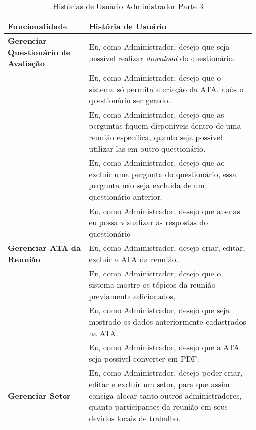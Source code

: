 \begin{table}[H]
	\begin{tabular}{|p{5.0cm}|p{10.0cm}|} 
	\hline
	\textbf{Funcionalidade} & \textbf{História de Usuário} \\ \hline
	\textbf{Gerenciar Questionário de Avaliação} & Eu, como Administrador, desejo que seja possível realizar \textit{download} do questionário. \\ \hline
	& Eu, como Administrador, desejo que o sistema só permita a criação da ATA, após o questionário ser gerado. \\ \hline
	& Eu, como Administrador, desejo que as perguntas fiquem disponíveis dentro de uma reunião específica, quanto seja possível utilizar-las em outro questionário. \\ \hline
	& Eu, como Administrador, desejo que ao excluir uma pergunta do questionário, essa pergunta não seja excluida de um questionário anterior. \\ \hline
	& Eu, como Administrador, desejo que apenas eu possa visualizar as respostas do questionário \\ \hline
	\textbf{Gerenciar ATA da Reunião} & Eu, como Administrador, desejo criar, editar, excluir a ATA da reunião.\\ \hline
	& Eu, como Administrador, desejo que o sistema mostre os tópicos da reunião previamente adicionados, \\ \hline
	& Eu, como Administrador, desejo que seja mostrado os dados anteriormente cadastrados na ATA. \\ \hline
	& Eu, como Administrador, desejo que a ATA seja possível converter em PDF. \\ \hline
	\textbf{Gerenciar Setor} & Eu, como Administrador, desejo poder criar, editar e excluir um setor, para que assim consiga alocar tanto outros administradores, quanto participantes da reunião em seus devidos locais de trabalho. \\ \hline
	\end{tabular}
	 \caption{Histórias de Usuário Administrador Parte 3}
	 \label{tab:historias_de_usuario_administrador_parte3}
\end{table}

